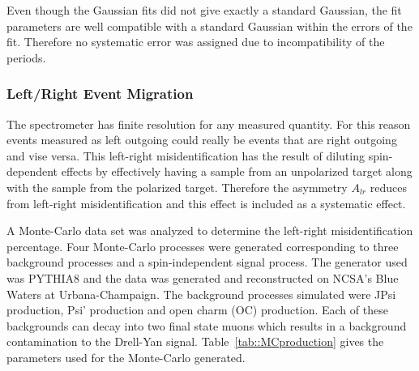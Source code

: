 Even though the Gaussian fits did not give exactly a standard Gaussian, the fit
parameters are well compatible with a standard Gaussian within the errors of the
fit.  Therefore no systematic error was assigned due to incompatibility of the
periods.

\subsubsection{Left/Right Event Migration} \label{sec::syslrEventMigration}
The spectrometer has finite resolution for any measured quantity.  For this
reason events measured as left outgoing could really be events that are right
outgoing and vise versa.  This left-right misidentification has the result of
diluting spin-dependent effects by effectively having a sample from an
unpolarized target along with the sample from the polarized target.  Therefore
the asymmetry $A_{lr}$ reduces from left-right misidentification and this
effect is included as a systematic effect. 

A Monte-Carlo data set was analyzed to determine the left-right
misidentification percentage.  Four Monte-Carlo processes were generated
corresponding to three background processes and a spin-independent signal
process.  The generator used was PYTHIA8 and the data was generated and
reconstructed on NCSA's Blue Waters at Urbana-Champaign.  The background
processes simulated were JPsi production, Psi' production and open charm (OC)
production.  Each of these backgrounds can decay into two final state muons
which results in a background contamination to the Drell-Yan signal.
Table~\ref{tab::MCproduction} gives the parameters used for the Monte-Carlo
generated.

